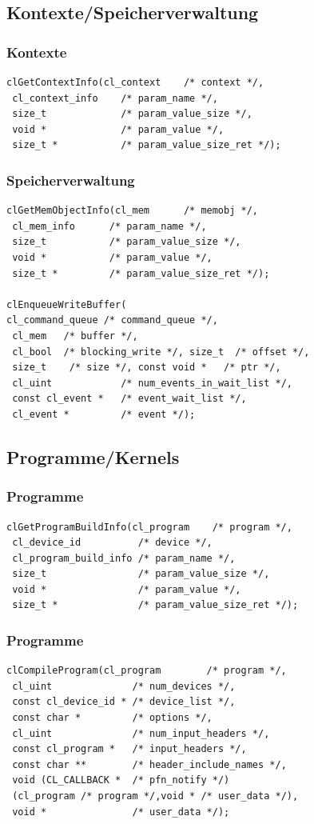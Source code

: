 \documentclass{beamer}
\begin{document}
\subsection{Kontexte/Speicherverwaltung}
\begin{frame}[fragile]
\frametitle{Kontexte}
\begin{lstlisting}
clGetContextInfo(cl_context    /* context */, 
 cl_context_info    /* param_name */, 
 size_t             /* param_value_size */, 
 void *             /* param_value */, 
 size_t *           /* param_value_size_ret */);
\end{lstlisting}
\end{frame}

\begin{frame}[fragile]
\frametitle{Speicherverwaltung}
\begin{lstlisting}
clGetMemObjectInfo(cl_mem      /* memobj */,
 cl_mem_info      /* param_name */, 
 size_t           /* param_value_size */,
 void *           /* param_value */,
 size_t *         /* param_value_size_ret */);

clEnqueueWriteBuffer(
cl_command_queue /* command_queue */,
 cl_mem   /* buffer */,
 cl_bool  /* blocking_write */, size_t  /* offset */,
 size_t    /* size */, const void *   /* ptr */, 
 cl_uint            /* num_events_in_wait_list */, 
 const cl_event *   /* event_wait_list */, 
 cl_event *         /* event */);
\end{lstlisting}
\end{frame}

\subsection{Programme/Kernels}
\begin{frame}[fragile]
\frametitle{Programme}
\begin{lstlisting}
clGetProgramBuildInfo(cl_program    /* program */,
 cl_device_id          /* device */,
 cl_program_build_info /* param_name */,
 size_t                /* param_value_size */,
 void *                /* param_value */,
 size_t *              /* param_value_size_ret */);
\end{lstlisting}
\end{frame}

\begin{frame}[fragile]
\frametitle{Programme}
\begin{lstlisting}
clCompileProgram(cl_program        /* program */,
 cl_uint              /* num_devices */,
 const cl_device_id * /* device_list */,
 const char *         /* options */, 
 cl_uint              /* num_input_headers */,
 const cl_program *   /* input_headers */,
 const char **        /* header_include_names */,
 void (CL_CALLBACK *  /* pfn_notify */)
 (cl_program /* program */,void * /* user_data */),
 void *               /* user_data */);
\end{lstlisting}
\end{frame}
\end{document}
